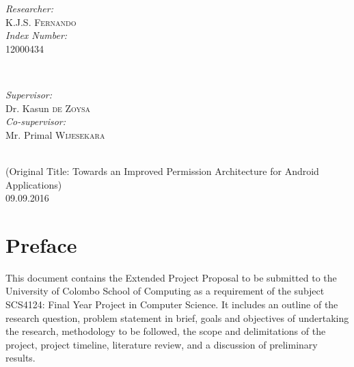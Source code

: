 \begin{titlepage}
\begin{minipage}{0.4\textwidth}
\begin{flushleft} \large
\emph{Researcher:}\\
K.J.S. \textsc{Fernando}\\ %
\emph{Index Number:}\\
12000434
\end{flushleft}
\end{minipage}
~
\begin{minipage}{0.4\textwidth}
\begin{flushright} \large
\emph{Supervisor:} \\
Dr. Kasun \textsc{de Zoysa}\\ %
\emph{Co-supervisor:} \\
Mr. Primal \textsc{Wijesekara}
\end{flushright}
\end{minipage}\\[2cm]


{\large (Original Title: Towards an Improved Permission Architecture for Android Applications)}
\\
{\large 09.09.2016} %


\vfill %

\end{titlepage}


\chapter*{Preface}

\par This document contains the Extended Project Proposal to be submitted to the University of Colombo School of Computing as a requirement of the subject SCS4124: Final Year Project in Computer Science. It includes an outline of the research question, problem statement in brief, goals and objectives of undertaking the research, methodology to be followed, the scope and delimitations of the project, project timeline, literature review, and a discussion of preliminary results. \\\\\\\\\\\\

